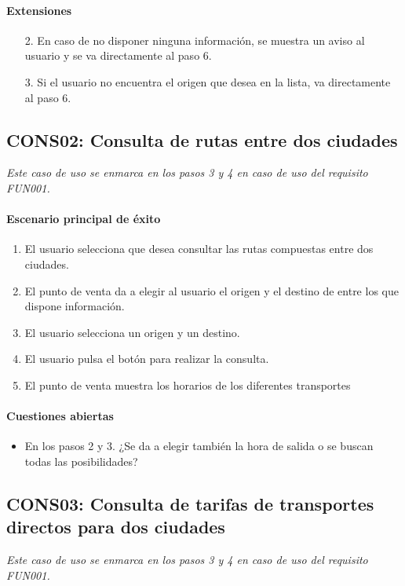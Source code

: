    \paragraph{Extensiones}
    \begin{enumerate}
      \item[2.] En caso de no disponer ninguna información, se muestra un aviso al usuario y se va directamente al paso 6.
      \item[3.] Si el usuario no encuentra el origen que desea en la lista, va directamente al paso 6.
    \end{enumerate}

  \subsection{CONS02: Consulta de rutas entre dos ciudades}
    \emph{Este caso de uso se enmarca en los pasos 3 y 4 en caso de uso del requisito FUN001.}
    \paragraph{Escenario principal de éxito}
    \begin{enumerate}
      \item El usuario selecciona que desea consultar las rutas compuestas entre dos ciudades.
      \item El punto de venta da a elegir al usuario el origen y el destino de entre los que dispone información.
      \item El usuario selecciona un origen y un destino.
      \item El usuario pulsa el botón para realizar la consulta.
      \item El punto de venta muestra los horarios de los diferentes transportes 
    \end{enumerate}

    \paragraph{Cuestiones abiertas}
    \begin{itemize}
       \item En los pasos 2 y 3. ¿Se da a elegir también la hora de salida o se buscan todas las posibilidades?
    \end{itemize}

  \subsection{CONS03: Consulta de tarifas de transportes directos para dos ciudades}
    \emph{Este caso de uso se enmarca en los pasos 3 y 4 en caso de uso del requisito FUN001.}
